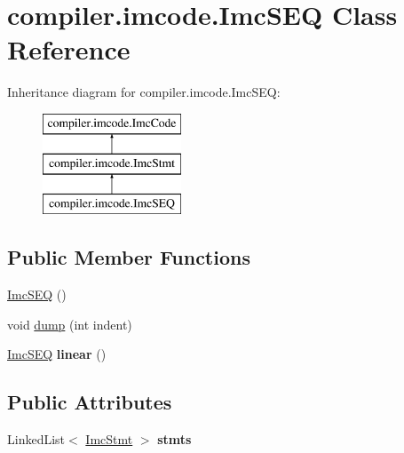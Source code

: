\hypertarget{classcompiler_1_1imcode_1_1_imc_s_e_q}{}\section{compiler.\+imcode.\+Imc\+S\+EQ Class Reference}
\label{classcompiler_1_1imcode_1_1_imc_s_e_q}
Inheritance diagram for compiler.\+imcode.\+Imc\+S\+EQ\+:\begin{figure}[H]
\begin{center}
\leavevmode
\includegraphics[height=3.000000cm]{classcompiler_1_1imcode_1_1_imc_s_e_q}
\end{center}
\end{figure}
\subsection*{Public Member Functions}
\begin{DoxyCompactItemize}
\item 
\hyperlink{classcompiler_1_1imcode_1_1_imc_s_e_q_a6d58cbc46c3701b6d4866cec298881e2}{Imc\+S\+EQ} ()
\item 
void \hyperlink{classcompiler_1_1imcode_1_1_imc_s_e_q_af5e7a76365d325473814eca4544cf8d2}{dump} (int indent)
\item 
\mbox{\label{classcompiler_1_1imcode_1_1_imc_s_e_q_a9bd64fb3d8c50b660499c4abbe9cc9e9}} 
\hyperlink{classcompiler_1_1imcode_1_1_imc_s_e_q}{Imc\+S\+EQ} {\bfseries linear} ()
\end{DoxyCompactItemize}
\subsection*{Public Attributes}
\begin{DoxyCompactItemize}
\item 
\mbox{\label{classcompiler_1_1imcode_1_1_imc_s_e_q_a89e6447427efe94b3dd903d88188ead6}} 
Linked\+List$<$ \hyperlink{classcompiler_1_1imcode_1_1_imc_stmt}{Imc\+Stmt} $>$ {\bfseries stmts}
\end{DoxyCompactItemize}


